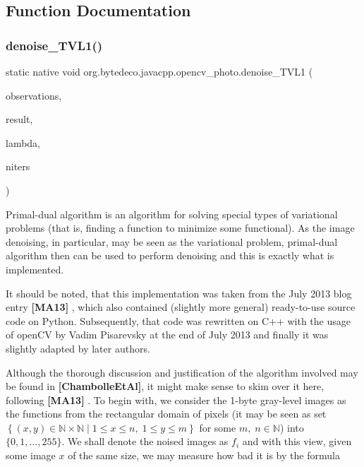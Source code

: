 \subsection{Function Documentation}
\mbox{\label{group__photo__denoise_ga69dacfb1b3386b1b2a2d270314c1b548}} 
\subsubsection{\texorpdfstring{denoise\+\_\+\+T\+V\+L1()}{denoise\_TVL1()}}
{\footnotesize\ttfamily static native void org.\+bytedeco.\+javacpp.\+opencv\+\_\+photo.\+denoise\+\_\+\+T\+V\+L1 (\begin{DoxyParamCaption}\item[{@Const @By\+Ref Mat\+Vector}]{observations,  }\item[{@By\+Ref Mat}]{result,  }\item[{double}]{lambda,  }\item[{int}]{niters }\end{DoxyParamCaption})\hspace{0.3cm}{\ttfamily [static]}}



Primal-\/dual algorithm is an algorithm for solving special types of variational problems (that is, finding a function to minimize some functional). As the image denoising, in particular, may be seen as the variational problem, primal-\/dual algorithm then can be used to perform denoising and this is exactly what is implemented. 

It should be noted, that this implementation was taken from the July 2013 blog entry {\bfseries [M\+A13]} , which also contained (slightly more general) ready-\/to-\/use source code on Python. Subsequently, that code was rewritten on C++ with the usage of open\+CV by Vadim Pisarevsky at the end of July 2013 and finally it was slightly adapted by later authors. 

Although the thorough discussion and justification of the algorithm involved may be found in {\bfseries [Chambolle\+Et\+Al]}, it might make sense to skim over it here, following {\bfseries [M\+A13]} . To begin with, we consider the 1-\/byte gray-\/level images as the functions from the rectangular domain of pixels (it may be seen as set $\left\{(x,y)\in\mathbb{N}\times\mathbb{N}\mid 1\leq x\leq n,\;1\leq y\leq m\right\}$ for some $m,\;n\in\mathbb{N}$) into $\{0,1,\dots,255\}$. We shall denote the noised images as $f_i$ and with this view, given some image $x$ of the same size, we may measure how bad it is by the formula 

